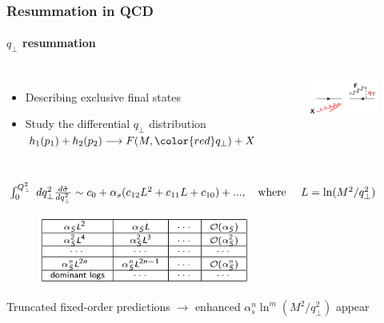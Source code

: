 \documentclass[aspectratio=43]{beamer}
\begin{document}
\begin{frame}

	\frametitle{Resummation in QCD}
	\framesubtitle{$q_{\perp}$ resummation}
	
	\footnotesize
	
	\begin{columns}
	
		
		\begin{itemize}
			\item Describing exclusive final states \\
			\item Study the differential $q_{\perp}$ distribution \\
			$h_{1}(p_{1}) + h_{2}(p_{2}) \longrightarrow F(M, {\color{red}q_{\perp}}) + X$
		\end{itemize}
		
		
		\begin{figure}
			\includegraphics[width = 4cm]{plots/part2/qT_diagram.png}
		\end{figure}

	\end{columns}
 
	$\int_{0}^{Q_{\perp}^{2}} \; dq_{\perp}^{2} \frac{d\hat{\sigma}}{dq_{\perp}^{2}} \sim c_{0} + \alpha_{s}(c_{12}L^{2} + c_{11}L + c_{10}) + ..., \textrm{\quad where \quad} L = \ln (M^{2} / q_{\perp}^{2})$

	\begin{figure}
		\includegraphics[width = 7cm]{plots/part2/qT_logs_table.png}
	\end{figure}

	Truncated fixed-order predictions $\rightarrow$ {\color{red}enhanced $\alpha_{s}^{n}\ln^{m}(M^{2}/q_{\perp}^{2})$ appear}

\end{frame}
\end{document}
